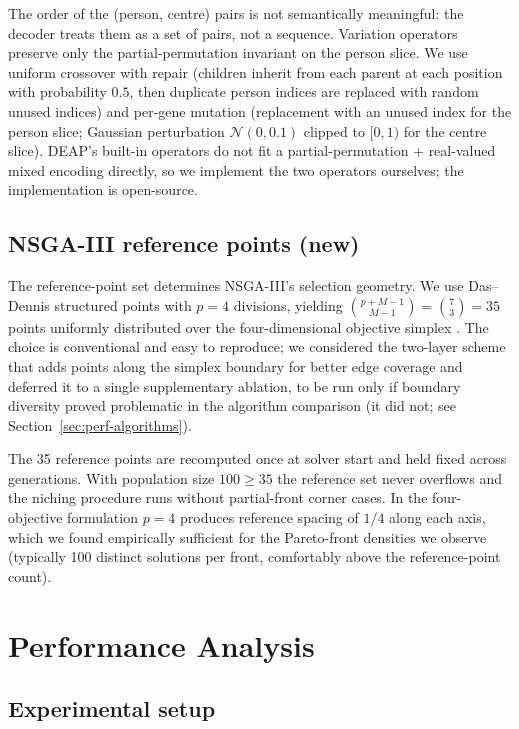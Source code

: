 \documentclass[applsci,article,submit,moreauthors,pdftex]{Definitions/mdpi}
\begin{document}
The order of the (person, centre) pairs is not semantically meaningful: the
decoder treats them as a set of pairs, not a sequence. Variation operators
preserve only the partial-permutation invariant on the person slice. We use
uniform crossover with repair (children inherit from each parent at each
position with probability $0.5$, then duplicate person indices are replaced
with random unused indices) and per-gene mutation (replacement with an
unused index for the person slice; Gaussian perturbation $\mathcal{N}(0, 0.1)$
clipped to $[0, 1)$ for the centre slice). DEAP's built-in operators do not
fit a partial-permutation + real-valued mixed encoding directly, so we
implement the two operators ourselves; the implementation is open-source.

\subsection{NSGA-III reference points (new)}\label{sec:algo-refpoints}

The reference-point set determines NSGA-III's selection geometry. We use
Das--Dennis structured points with $p = 4$ divisions, yielding
$\binom{p + M - 1}{M - 1} = \binom{7}{3} = 35$ points uniformly distributed
over the four-dimensional objective simplex \cite{deb2014nsga3}. The choice
is conventional and easy to reproduce; we considered the two-layer scheme
that adds points along the simplex boundary for better edge coverage and
deferred it to a single supplementary ablation, to be run only if boundary
diversity proved problematic in the algorithm comparison (it did not; see
Section~\ref{sec:perf-algorithms}).

The 35 reference points are recomputed once at solver start and held fixed
across generations. With population size $100 \ge 35$ the reference set
never overflows and the niching procedure runs without partial-front
corner cases. In the four-objective formulation $p = 4$ produces reference
spacing of $1/4$ along each axis, which we found empirically sufficient for
the Pareto-front densities we observe (typically 100 distinct solutions
per front, comfortably above the reference-point count).

\section{Performance Analysis}\label{sec:performance}

\subsection{Experimental setup}\label{sec:perf-setup}
\end{document}
